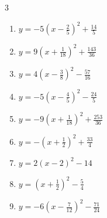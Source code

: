 \begin{multicols}{3}
\begin{enumerate}

  \item $\displaystyle y=-5\left( x-\frac{2}{5}\right)^{2}+\frac{14}{5}$


  \item $\displaystyle y=9\left( x+\frac{1}{18}\right)^{2}+\frac{143}{36}$


  \item $\displaystyle y=4\left( x-\frac{3}{8}\right)^{2}-\frac{57}{16}$


\columnbreak %

  \item $\displaystyle y=-5\left( x-\frac{4}{5}\right)^{2}-\frac{24}{5}$


  \item $\displaystyle y=-9\left( x+\frac{1}{18}\right)^{2}+\frac{253}{36}$


  \item $\displaystyle y=-\left( x+\frac{1}{2}\right)^{2}+\frac{33}{4}$


  \item $\displaystyle y=2\left( x-2\right)^{2}-14$

        \phantom{$\displaystyle 頂点\left( 2 , -14 \right)$}

  \item $\displaystyle y=\left( x+\frac{1}{2}\right)^{2}-\frac{5}{4}$


  \item $\displaystyle y=-6\left( x-\frac{7}{12}\right)^{2}-\frac{71}{24}$



\end{enumerate}
\end{multicols}

